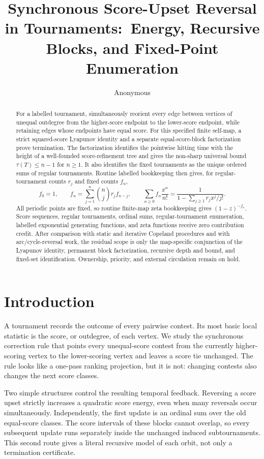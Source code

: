 \documentclass[11pt,a4paper]{amsart}
\title[Score-upset reversal]{Synchronous Score-Upset Reversal in Tournaments:\
Energy, Recursive Blocks, and Fixed-Point Enumeration}
\author{Anonymous}
\date{}
\theoremstyle{definition}
\theoremstyle{remark}
\begin{document}
\begin{abstract}
For a labelled tournament, simultaneously reorient every edge between
vertices of unequal outdegree from the higher-score endpoint to the
lower-score endpoint, while retaining edges whose endpoints have equal
score.  For this specified finite self-map, a strict squared-score Lyapunov
identity and a separate equal-score-block factorization prove termination.
The factorization identifies the pointwise hitting time with the height of a
well-founded score-refinement tree and gives the non-sharp universal bound
$\tau(T)\leq n-1$ for $n\geq1$.  It also identifies the fixed tournaments as
the unique ordered sums of regular tournaments.  Routine labelled
bookkeeping then gives, for regular-tournament counts $r_j$ and fixed counts
$f_n$,
\[
 f_0=1,\qquad f_n=\sum_{j=1}^n\binom nj r_jf_{n-j},\qquad
 \sum_{n\geq0}f_n\frac{x^n}{n!}
 =\frac{1}{1-\sum_{j\geq1}r_jx^j/j!}.
\]
All periodic points are fixed, so routine finite-map zeta bookkeeping gives
$(1-z)^{-f_n}$.  Score sequences, regular tournaments, ordinal sums,
regular-tournament enumeration, labelled exponential generating functions,
and zeta functions receive zero contribution credit.  After comparison with
static and iterative Copeland procedures and with arc/cycle-reversal work,
the residual scope is only the map-specific conjunction of the Lyapunov
identity, permanent block factorization, recursive depth and bound, and
fixed-set identification.  Ownership, priority, and external circulation
remain on hold.
\end{abstract}

\maketitle

\section{Introduction}

A tournament records the outcome of every pairwise contest.  Its most basic
local statistic is the score, or outdegree, of each vertex.  We study the
synchronous correction rule that points every unequal-score contest from
the currently higher-scoring vertex to the lower-scoring vertex and leaves
a score tie unchanged.  The rule looks like a one-pass ranking projection,
but it is not: changing contests also changes the next score classes.

Two simple structures control the resulting temporal feedback.  Reversing
a score upset strictly increases a quadratic score energy, even when many
reversals occur simultaneously.  Independently, the first update is an
ordinal sum over the old equal-score classes.  The score intervals of these
blocks cannot overlap, so every subsequent update runs separately inside
the unchanged induced subtournaments.  This second route gives a literal
recursive model of each orbit, not only a termination certificate.
\end{document}
